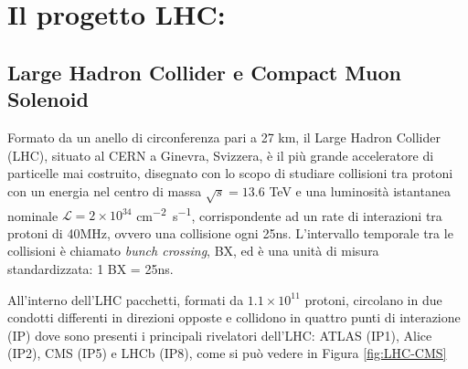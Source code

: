 \chapter{Il progetto LHC:}


\section{Large Hadron Collider e Compact Muon Solenoid}
Formato da un anello di circonferenza pari a 27 km, il Large Hadron Collider (LHC), situato al CERN a Ginevra, Svizzera, è il più grande acceleratore di particelle mai costruito, disegnato con lo scopo di studiare collisioni tra protoni con un energia nel centro di massa $\sqrt{s} = 13.6$ TeV e una luminosità istantanea nominale $\mathcal{L} = 2 \times 10^{34}$ \si{cm^{-2} s^{-1}}, corrispondente ad un rate di interazioni tra protoni di 40MHz, ovvero una collisione ogni 25ns. L'intervallo temporale tra le collisioni è chiamato \textit{bunch crossing}, BX, ed è una unità di misura standardizzata: 1 BX = 25ns.

All'interno dell'LHC pacchetti, formati da $1.1 \times 10^{11}$ protoni, circolano in due condotti differenti in direzioni opposte e collidono in quattro punti di interazione (IP) dove sono presenti i principali rivelatori dell'LHC: ATLAS (IP1), Alice (IP2), CMS (IP5) e LHCb (IP8), come si può vedere in Figura \ref{fig:LHC-CMS}

